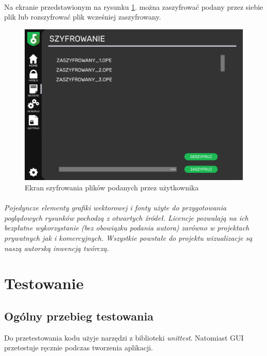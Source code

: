 \documentclass[a4paper]{article}
\begin{document}
\newpage

\paragraph{}Na ekranie przedstawionym na rysunku \ref{fig:szyfrowanie}. można zaszyfrować podany przez siebie plik lub rozszyfrować plik wcześniej zaszyfrowany.
\begin{figure}[H]
    \centering
    \includegraphics[width=1\textwidth]{img/ekran_szyfrowania.png}
    \caption{Ekran szyfrowania plików podanych przez użytkownika}
    \label{fig:szyfrowanie}
\end{figure}

\paragraph{}\textit{Pojedyncze elementy grafiki wektorowej i fonty użyte do przygotowania poglądowych rysunków pochodzą z otwartych źródeł. Licencje pozwalają na ich bezpłatne wykorzystanie (bez obowiązku podania autora) zarówno w projektach prywatnych jak i komercyjnych. Wszystkie powstałe do projektu wizualizacje są naszą autorską inwencją twórczą.}

\section{Testowanie}
\subsection{Ogólny przebieg testowania}
Do przetestowania kodu użyje narzędzi z biblioteki \textit{unittest}. Natomiast GUI przetestuje ręcznie podczas tworzenia aplikacji.
\label{end}
\end{document}
